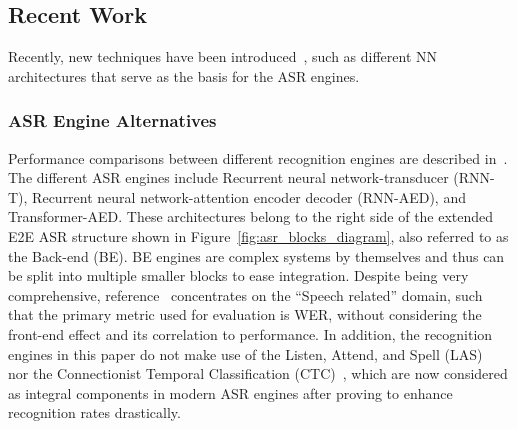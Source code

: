 


\subsection{Recent Work}
Recently, new techniques have been introduced~\cite{900384911,20202222222,9003849,7471664,8466865},
such as
different NN architectures that serve as the basis for
the ASR engines.  

\subsubsection{ASR Engine Alternatives}
Performance comparisons between different recognition
engines are described in~\cite{900384911}. 
The different ASR engines include 
Recurrent neural network-transducer (RNN-T), 
Recurrent neural network-attention encoder decoder (RNN-AED),
and Transformer-AED.
These architectures belong to the right side
of the extended E2E ASR structure shown in 
Figure~\ref{fig:asr_blocks_diagram}, 
also referred to as the
Back-end (BE).
BE engines are complex systems by themselves
and thus can be split into multiple smaller
blocks to ease integration.
Despite being very comprehensive, reference~\cite{900384911} 
concentrates on
the ``Speech related'' domain,
such that the primary metric used for evaluation is WER,
without considering the front-end
effect and its correlation to performance.
In addition, the recognition engines in this paper
do not make use of the 
Listen, Attend, and Spell (LAS)~\cite{7472621}
nor the Connectionist Temporal 
Classification (CTC)~\cite{hannun2017sequence},
which are now considered as integral components in modern 
ASR engines after proving to enhance recognition rates drastically. 

